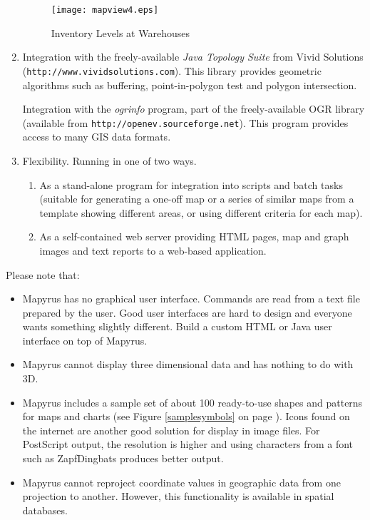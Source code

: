 \begin{enumerate}
\begin{figure}
\texttt{[image: mapview4.eps]}
\caption{Inventory Levels at Warehouses}
\label{mapview4}
\end{figure}


\item
Integration with the freely-available
\textit{Java Topology Suite} from Vivid Solutions
(\texttt{http://www.vividsolutions.com}).
This library provides geometric algorithms
such as buffering, point-in-polygon test and polygon intersection.

Integration with the
\textit{ogrinfo} program, part of the
freely-available OGR library
(available from \texttt{http://openev.sourceforge.net}).
This program provides access to many GIS data formats.

\item
Flexibility.  Running in one of two ways.

\begin{enumerate}
\item
As a stand-alone program for integration into
scripts and batch tasks (suitable for generating a one-off
map or a series of similar maps from a template
showing different areas, or using different criteria for each map).

\item
As a self-contained web server providing HTML pages, map and
graph images and text reports to a web-based application.

\end{enumerate}

\end{enumerate}


Please note that:

\begin{itemize}

\item
Mapyrus has no graphical user interface.
Commands are read from a text file prepared by the user.
Good user interfaces are
hard to design and everyone wants something slightly different.
Build a custom HTML or Java user interface on top of Mapyrus.

\item
Mapyrus cannot display three dimensional data and has nothing to do
with 3D.

\item
Mapyrus includes a sample set of about 100 ready-to-use shapes and patterns
for maps and charts (see Figure \ref{samplesymbols}
on page \pageref{samplesymbols}).
Icons found on the
internet are another good solution for display in image files.
For PostScript output, the resolution is higher and using characters
from a font such as ZapfDingbats produces better output.

\item
Mapyrus cannot reproject coordinate values in geographic data from
one projection to another.  However, this functionality
is available in spatial databases.
\end{itemize}

